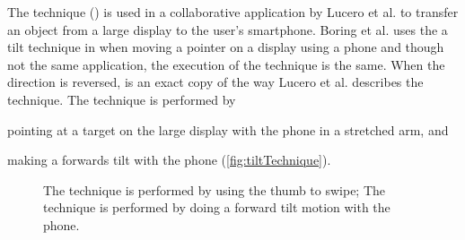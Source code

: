The \tilt technique () is used in a collaborative application by Lucero et al. \cite{Lucero:2012} to transfer an object from a large display to the user's smartphone.
Boring et al. uses the a tilt technique in \cite{Boring:2009} when moving a pointer on a display using a phone and though not the same application, the execution of the technique is the same.
When the direction is reversed, \tilt is an exact copy of the way Lucero et al. describes the technique.
The \tilt technique is performed by 
\begin{enumerate*}[label=\itshape\roman*\upshape)]
	\item{pointing at a target on the large display with the phone in a stretched arm, and}
	\item{making a forwards tilt with the phone (\cref{fig:tiltTechnique}).}
\end{enumerate*}

\begin{figure}[H]
\caption{
	\protect{} The \swipe technique is performed by using the thumb to swipe;
	\protect{} The \tilt technique is performed by doing a forward tilt motion with the phone.
}
\label{fig:swipeTilt}
\end{figure}

